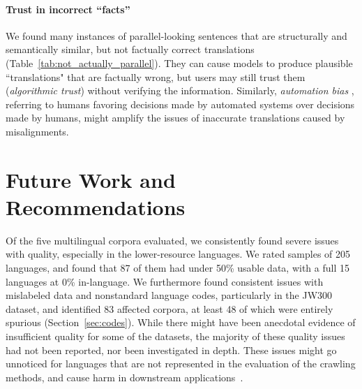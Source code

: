 \paragraph{Trust in incorrect ``facts''} %
We found many instances of parallel-looking sentences that are structurally and semantically similar, but not factually correct translations (Table~\ref{tab:not_actually_parallel}). They can cause models to produce plausible ``translations" that are factually wrong, but users may still trust them (\textit{algorithmic trust}) without verifying the information. %
Similarly, \textit{automation bias} \citep{skitka-etal-1999-does},
referring to humans favoring decisions made by automated systems over decisions made by humans, might amplify the issues of inaccurate translations caused by misalignments.

\section{Future Work and Recommendations}\label{sec:recommendation}
Of the five multilingual corpora evaluated, we consistently found severe issues with quality, especially in the lower-resource languages. We rated samples of 205 languages, and found that 87 of them had under 50\% usable data, with a full 15 languages at 0\% in-language. We furthermore found consistent issues with mislabeled data and nonstandard language codes, particularly in the JW300 dataset, and identified 83 affected corpora, at least 48 of which were entirely spurious (Section~\ref{sec:codes}). While there might have been anecdotal evidence of insufficient quality for some of the datasets, the majority of these quality issues had not been reported, nor been investigated in depth. These issues might go unnoticed for languages that are not represented in the evaluation of the crawling methods, and cause harm in downstream applications~\citep{khayrallah-koehn-2018-impact}.

